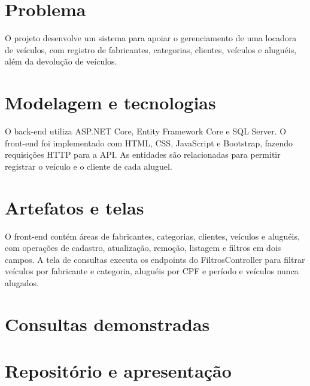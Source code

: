 \section{Problema}
O projeto desenvolve um sistema para apoiar o gerenciamento de uma locadora de veículos, com registro de fabricantes, categorias, clientes, veículos e aluguéis, além da devolução de veículos.
\section{Modelagem e tecnologias}
O back-end utiliza ASP.NET Core, Entity Framework Core e SQL Server. O front-end foi implementado com HTML, CSS, JavaScript e Bootstrap, fazendo requisições HTTP para a API. As entidades são relacionadas para permitir registrar o veículo e o cliente de cada aluguel.
\section{Artefatos e telas}
O front-end contém áreas de fabricantes, categorias, clientes, veículos e aluguéis, com operações de cadastro, atualização, remoção, listagem e filtros em dois campos. A tela de consultas executa os endpoints do FiltrosController para filtrar veículos por fabricante e categoria, aluguéis por CPF e período e veículos nunca alugados.
\section{Consultas demonstradas}
\section{Repositório e apresentação}
